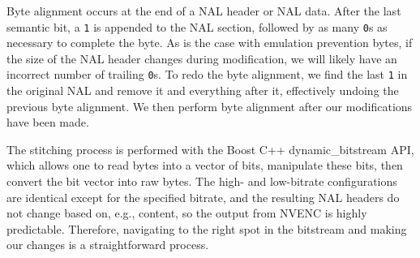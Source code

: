 Byte alignment occurs at the end of a NAL header or NAL data. After the last semantic bit, a \texttt{1} is appended to the NAL section, followed by as many \texttt{0}s as necessary to complete the byte. As is the case with emulation prevention bytes, if the size of the NAL header changes during modification, we will likely have an incorrect number of trailing \texttt{0}s. To redo the byte alignment, we find the last \texttt{1} in the original NAL and remove it and everything after it, effectively undoing the previous byte alignment. We then perform byte alignment after our modifications have been made.

The stitching process is performed with the Boost C++ dynamic\_bitstream API, which allows one to read bytes into a vector of bits, manipulate these bits, then convert the bit vector into raw bytes. The high- and low-bitrate configurations are identical except for the specified bitrate, and the resulting NAL headers do not change based on, e.g., content, so the output from NVENC is highly predictable. Therefore, navigating to the right spot in the bitstream and making our changes is a straightforward process.

